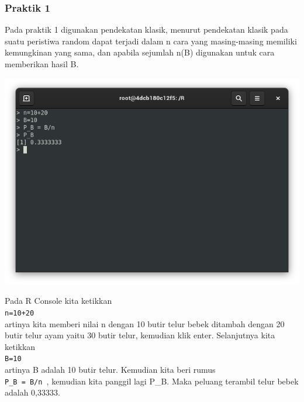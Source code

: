 \documentclass[a4paper,12pt]{article}
\begin{document}
\subsubsection{Praktik 1}
Pada praktik 1 digunakan pendekatan klasik, menurut pendekatan klasik pada suatu peristiwa random dapat terjadi dalam n cara yang masing-masing memiliki kemungkinan yang sama, dan apabila sejumlah n(B) digunakan untuk cara memberikan hasil B.
\begin{center}
	\includegraphics[scale=.5]{prak1}
\end{center}
Pada R Console kita ketikkan\\
\texttt{n=10+20}\\
artinya kita memberi nilai n dengan 10 butir telur bebek ditambah dengan 20 butir telur ayam yaitu 30 butir telur, kemudian klik enter. Selanjutnya kita ketikkan \\
\texttt{B=10}\\
artinya B adalah 10 butir telur. Kemudian kita beri rumus\\ 
\texttt{P\_B = B/n }, kemudian kita panggil lagi P\_B. Maka peluang terambil telur bebek adalah 0,33333.
\end{document}
